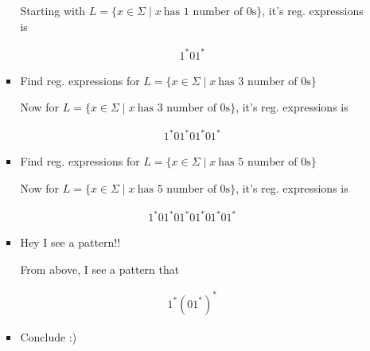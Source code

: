 \documentclass[12pt]{article}
\begin{document}
\begin{enumerate}[a.]
\begin{enumerate}[1.]
\begin{itemize}
            Starting with $L = \{x \in \Sigma \mid x\:\text{has 1 number of 0s}\}$,
            it's reg. expressions is

            \begin{mdframed}
                \begin{align}
                    1^*01^*
                \end{align}
            \end{mdframed}

            \item Find reg. expressions for $L = \{x \in \Sigma \mid x\:\text{has 3 number of 0s}\}$

            \bigskip

            Now for  $L = \{x \in \Sigma \mid x\:\text{has 3 number of 0s}\}$,
            it's reg. expressions is

            \bigskip

            \begin{mdframed}
                \begin{align}
                    1^*01^*01^*01^*
                \end{align}
            \end{mdframed}

            \item Find reg. expressions for $L = \{x \in \Sigma \mid x\:\text{has 5 number of 0s}\}$

            \bigskip

            Now for $L = \{x \in \Sigma \mid x\:\text{has 5 number of 0s}\}$,
            it's reg. expressions is

            \bigskip

            \begin{mdframed}
                \begin{align}
                    1^*01^*01^*01^*01^*01^*
                \end{align}
            \end{mdframed}

            \item Hey I see a pattern!!
            \begin{mdframed}
                From above, I see a pattern that

                \begin{align}
                    1^*(01^*)^*
                \end{align}
            \end{mdframed}
            \item Conclude :)


\end{itemize}
\end{enumerate}
\end{enumerate}
\end{document}
